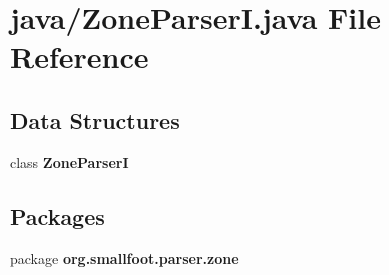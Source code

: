 \section{java/\-Zone\-Parser\-I.java File Reference}
\label{ZoneParserI_8java}
\subsection*{Data Structures}
\begin{DoxyCompactItemize}
\item 
class {\bf Zone\-Parser\-I}
\end{DoxyCompactItemize}
\subsection*{Packages}
\begin{DoxyCompactItemize}
\item 
package {\bf org.\-smallfoot.\-parser.\-zone}
\end{DoxyCompactItemize}
